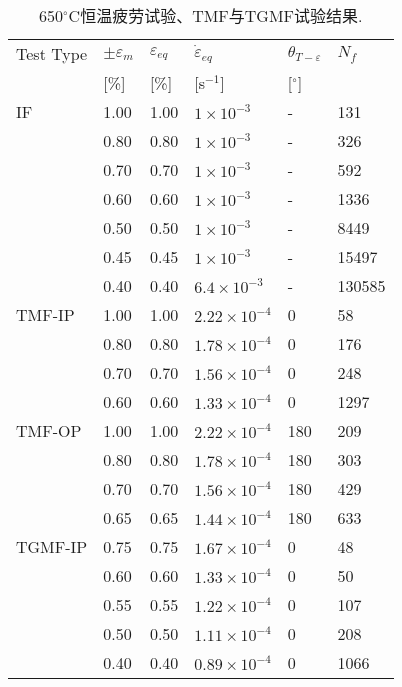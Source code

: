 \documentclass{article}
\begin{document}
\begin{table}[htbp]
  \centering
  \caption{650$^{\circ}$C恒温疲劳试验、TMF与TGMF试验结果.}
    \begin{tabular}{llllll}
    \toprule
    Test Type & $\pm \varepsilon _m$ & $\varepsilon _{eq}$ & $\dot \varepsilon _{eq}$ & $\theta_{T-\varepsilon}$ & $N_f$ \\
          & [\%]  & [\%]  & [s$^{-1}$] & [$^\circ$] &  \\
    \midrule
    IF & 1.00  & 1.00  & $1\times 10^{-3}$ & -     & 131 \\
          & 0.80  & 0.80  & $1\times 10^{-3}$ & -     & 326 \\
          & 0.70  & 0.70  & $1\times 10^{-3}$ & -     & 592 \\
          & 0.60  & 0.60  & $1\times 10^{-3}$ & -     & 1336 \\
          & 0.50  & 0.50  & $1\times 10^{-3}$ & -     & 8449 \\
          & 0.45  & 0.45  & $1\times 10^{-3}$ & -     & 15497 \\
          & 0.40  & 0.40  & $6.4\times 10^{-3}$ & -     & 130585 \\
    \midrule
    TMF-IP & 1.00  & 1.00  & $2.22\times 10^{-4}$ & 0     & 58 \\
          & 0.80  & 0.80  & $1.78\times 10^{-4}$ & 0     & 176 \\
          & 0.70  & 0.70  & $1.56\times 10^{-4}$ & 0     & 248 \\
          & 0.60  & 0.60  & $1.33\times 10^{-4}$ & 0     & 1297 \\
    \midrule
    TMF-OP & 1.00  & 1.00  & $2.22\times 10^{-4}$ & 180   & 209 \\
          & 0.80  & 0.80  & $1.78\times 10^{-4}$ & 180   & 303 \\
          & 0.70  & 0.70  & $1.56\times 10^{-4}$ & 180   & 429 \\
          & 0.65  & 0.65  & $1.44\times 10^{-4}$ & 180   & 633 \\
    \midrule
    TGMF-IP & 0.75  & 0.75  & $1.67\times 10^{-4}$ & 0     & 48 \\
          & 0.60  & 0.60  & $1.33\times 10^{-4}$ & 0     & 50 \\
          & 0.55  & 0.55  & $1.22\times 10^{-4}$ & 0     & 107 \\
          & 0.50  & 0.50  & $1.11\times 10^{-4}$ & 0     & 208 \\
          & 0.40  & 0.40  & $0.89\times 10^{-4}$ & 0     & 1066 \\

\end{tabular}
\end{table}
\end{document}
